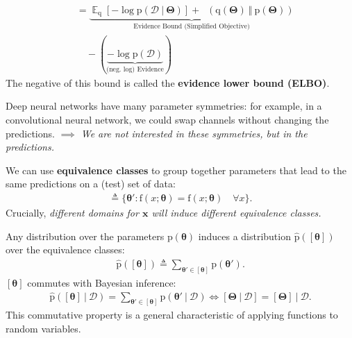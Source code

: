 \documentclass[25pt,a0paper,landscape]{tikzposter}
\DeclareMathOperator{\opExpectation}{\mathbb{E}}
\newcommand{\E}[2]{\opExpectation_{#1} \left [ #2 \right ]}
\newcommand{\MidSymbol}[1][]{\:#1\:}
\newcommand{\given}{\MidSymbol[\vert]}
\DeclareMathOperator{\opKale}{D_\mathrm{KL}}
\newcommand{\Kale}[2]{\opKale(#1 \MidSymbol[\Vert] #2)}
\newcommand{\opp}{\mathrm{p}}
\newcommand{\pof}[1]{\opp(#1)}
\newcommand{\hpof}[1]{\hat{\opp}(#1)}
\newcommand{\opq}{\mathrm{q}}
\newcommand{\qof}[1]{\opq(#1)}
\newcommand{\w}{\boldsymbol{\theta}}
\newcommand{\W}{\boldsymbol{\Theta}}
\newcommand{\opf}{\mathrm{f}}
\newcommand{\fof}[1]{\opf(#1)}
\newcommand{\Dany}{\mathcal{D}}
\newcommand{\x}{\boldsymbol{x}}
\begin{document}
\begin{columns}
{\begin{multicols}{2}
\begin{backgroundbox}[title=(Regular) Variational Inference \& ELBO]
\begin{align*}
      &\, = \underbrace{\E{\opq}{-\log \pof{\Dany \given \W}} + \Kale{\qof{\W}}{\pof{\W}}}_{\text{Evidence Bound (Simplified Objective)}} \\
      &\, \quad - (\underbrace{-\log \pof{\Dany}}_{\text{(neg.~log) Evidence}})
      \end{align*}
      The negative of this bound is called the \textbf{evidence lower bound (ELBO)}.
    \end{backgroundbox}
    \begin{theorybox}[title=Parameter Symmetries]
      Deep neural networks have many parameter symmetries: for example, in a convolutional neural network, we could swap channels without changing the predictions.
      \emph{$\implies$ We are not interested in these symmetries, but in the predictions.}
    \end{theorybox}
    \begin{theorybox}[title=Equivalence Classes]
      We can use \textbf{equivalence classes} to group together parameters that lead to the same predictions on a (test) set of data:
      \begin{align*}
        [\w] \triangleq \{\w' : \fof{x ; \w} = \fof{x ; \w} \quad \forall x \}.
      \end{align*}
      Crucially, \emph{different domains for $\x$ will induce different equivalence classes.}
    \end{theorybox}
    \begin{theorybox}[title=Consistency of Equivalence Classes with Bayesian Inference]
      Any distribution over the parameters $\pof{\w}$ induces a distribution $\hpof{[\w]}$ over the equivalence classes:
      \begin{align*}
        \hpof{[\w]} \triangleq \sum_{\w' \in [\w]} \pof{\w'}.
      \end{align*}
      $[\w]$ commutes with Bayesian inference:
      \begin{align*}
        \hpof{[\w] \given \Dany} = \sum_{\w' \in [\w]} \pof{\w' \given \Dany}
        \Leftrightarrow [\W \given \Dany] = [\W] \given \Dany.
      \end{align*}
      This commutative property is a general characteristic of applying functions to random variables. 
    \end{theorybox}

\end{multicols}}
\end{columns}
\end{document}
